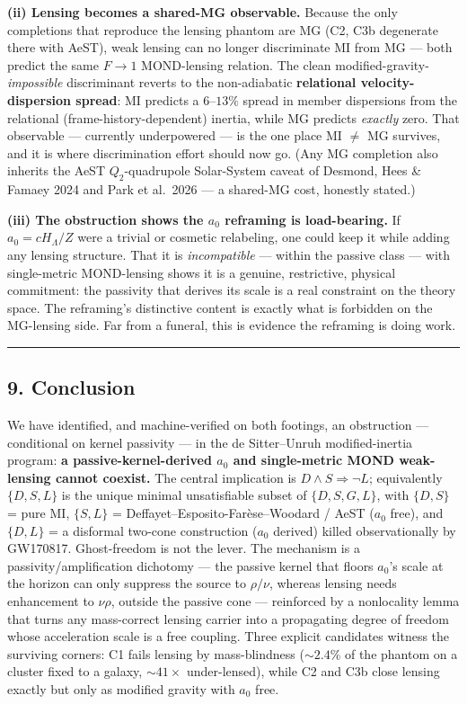 \documentclass[
]{article}
\begin{document}
\textbf{(ii) Lensing becomes a shared-MG observable.} Because the only
completions that reproduce the lensing phantom are MG (C2, C3b
degenerate there with AeST), weak lensing can no longer discriminate MI
from MG --- both predict the same \(F\to1\) MOND-lensing relation. The
clean modified-gravity-\emph{impossible} discriminant reverts to the
non-adiabatic \textbf{relational velocity-dispersion spread}: MI
predicts a \(6\)--\(13\%\) spread in member dispersions from the
relational (frame-history-dependent) inertia, while MG predicts
\emph{exactly} zero. That observable --- currently underpowered --- is
the one place MI \(\neq\) MG survives, and it is where discrimination
effort should now go. (Any MG completion also inherits the AeST
\(Q_2\)-quadrupole Solar-System caveat of Desmond, Hees \& Famaey 2024
and Park et al.~2026 --- a shared-MG cost, honestly stated.)

\textbf{(iii) The obstruction shows the \(a_0\) reframing is
load-bearing.} If \(a_0=cH_\Lambda/Z\) were a trivial or cosmetic
relabeling, one could keep it while adding any lensing structure. That
it is \emph{incompatible} --- within the passive class --- with
single-metric MOND-lensing shows it is a genuine, restrictive, physical
commitment: the passivity that derives its scale is a real constraint on
the theory space. The reframing's distinctive content is exactly what is
forbidden on the MG-lensing side. Far from a funeral, this is evidence
the reframing is doing work.

\begin{center}\rule{0.5\linewidth}{0.5pt}\end{center}

\subsection{9. Conclusion}\label{conclusion}

We have identified, and machine-verified on both footings, an
obstruction --- conditional on kernel passivity --- in the de
Sitter--Unruh modified-inertia program: \textbf{a passive-kernel-derived
\(a_0\) and single-metric MOND weak-lensing cannot coexist.} The central
implication is \(D\wedge S\Rightarrow\lnot L\); equivalently
\(\{D,S,L\}\) is the unique minimal unsatisfiable subset of
\(\{D,S,G,L\}\), with \(\{D,S\}\) = pure MI, \(\{S,L\}\) =
Deffayet--Esposito-Farèse--Woodard / AeST (\(a_0\) free), and
\(\{D,L\}\) = a disformal two-cone construction (\(a_0\) derived) killed
observationally by GW170817. Ghost-freedom is not the lever. The
mechanism is a passivity/amplification dichotomy --- the passive kernel
that floors \(a_0\)'s scale at the horizon can only suppress the source
to \(\rho/\nu\), whereas lensing needs enhancement to \(\nu\rho\),
outside the passive cone --- reinforced by a nonlocality lemma that
turns any mass-correct lensing carrier into a propagating degree of
freedom whose acceleration scale is a free coupling. Three explicit
candidates witness the surviving corners: C1 fails lensing by
mass-blindness (\(\sim2.4\%\) of the phantom on a cluster fixed to a
galaxy, \(\sim41\times\) under-lensed), while C2 and C3b close lensing
exactly but only as modified gravity with \(a_0\) free.
\end{document}
